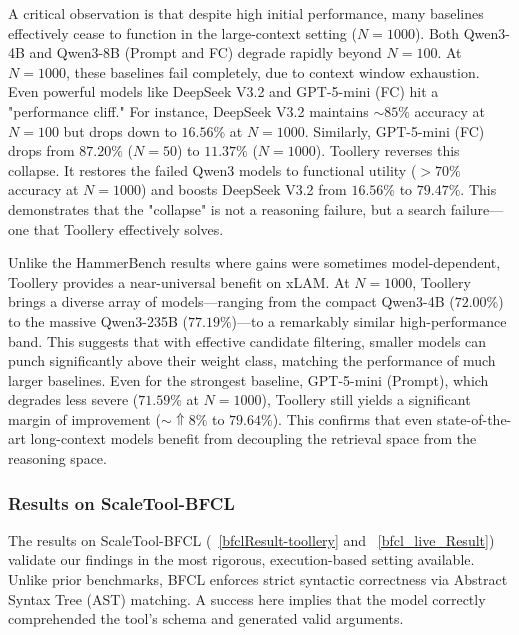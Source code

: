 \documentclass[11pt]{article}
\begin{document}
A critical observation is that despite high initial performance, many baselines effectively cease to function in the large-context setting ($N=1000$). Both Qwen3-4B and Qwen3-8B (Prompt and FC) degrade rapidly beyond $N=100$. At $N=1000$, these baselines fail completely, due to context window exhaustion. Even powerful models like DeepSeek V3.2 and GPT-5-mini (FC) hit a "performance cliff." For instance, DeepSeek V3.2 maintains $\sim85\%$ accuracy at $N=100$ but drops down to $16.56\%$ at $N=1000$. Similarly, GPT-5-mini (FC) drops from $87.20\%$ ($N=50$) to $11.37\%$ ($N=1000$). Toollery reverses this collapse. It restores the failed Qwen3 models to functional utility ($>70\%$ accuracy at $N=1000$) and boosts DeepSeek V3.2 from $16.56\%$ to $79.47\%$. This demonstrates that the "collapse" is not a reasoning failure, but a search failure---one that Toollery effectively solves.

Unlike the HammerBench results where gains were sometimes model-dependent, Toollery provides a near-universal benefit on xLAM. At $N=1000$, Toollery brings a diverse array of models---ranging from the compact Qwen3-4B ($72.00\%$) to the massive Qwen3-235B ($77.19\%$)---to a remarkably similar high-performance band. This suggests that with effective candidate filtering, smaller models can punch significantly above their weight class, matching the performance of much larger baselines. Even for the strongest baseline, GPT-5-mini (Prompt), which degrades less severe ($71.59\%$ at $N=1000$), Toollery still yields a significant margin of improvement ($\sim \Uparrow 8\%$ to $79.64\%$). This confirms that even state-of-the-art long-context models benefit from decoupling the retrieval space from the reasoning space.


\subsubsection{Results on ScaleTool-BFCL}



The results on ScaleTool-BFCL (~\ref{bfclResult-toollery} and ~\ref{bfcl_live_Result}) validate our findings in the most rigorous, execution-based setting available. Unlike prior benchmarks, BFCL enforces strict syntactic correctness via Abstract Syntax Tree (AST) matching. A success here implies that the model correctly comprehended the tool's schema and generated valid arguments.
\end{document}
